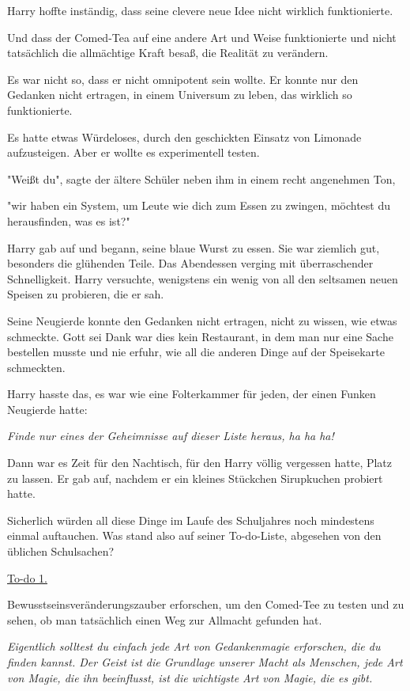 {Harry hoffte inständig, dass seine clevere neue Idee nicht wirklich funktionierte.

Und dass der Comed-Tea auf eine andere Art und Weise funktionierte und nicht tatsächlich die allmächtige Kraft besaß, die Realität zu verändern.

Es war nicht so, dass er nicht omnipotent sein wollte. Er konnte nur den Gedanken nicht ertragen, in einem Universum zu leben, das wirklich so funktionierte.

Es hatte etwas Würdeloses, durch den geschickten Einsatz von Limonade aufzusteigen. Aber er wollte es experimentell testen.

"Weißt du", sagte der ältere Schüler neben ihm in einem recht angenehmen Ton,

"wir haben ein System, um Leute wie dich zum Essen zu zwingen, möchtest du herausfinden, was es ist?"

Harry gab auf und begann, seine blaue Wurst zu essen. Sie war ziemlich gut, besonders die glühenden Teile. Das Abendessen verging mit überraschender Schnelligkeit. Harry versuchte, wenigstens ein wenig von all den seltsamen neuen Speisen zu probieren, die er sah.

Seine Neugierde konnte den Gedanken nicht ertragen, nicht zu wissen, wie etwas schmeckte. Gott sei Dank war dies kein Restaurant, in dem man nur eine Sache bestellen musste und nie erfuhr, wie all die anderen Dinge auf der Speisekarte schmeckten.

Harry hasste das, es war wie eine Folterkammer für jeden, der einen Funken Neugierde hatte:

\emph{Finde nur eines der Geheimnisse auf dieser Liste heraus, ha ha ha!}

Dann war es Zeit für den Nachtisch, für den Harry völlig vergessen hatte, Platz zu lassen. Er gab auf, nachdem er ein kleines Stückchen Sirupkuchen probiert hatte.

Sicherlich würden all diese Dinge im Laufe des Schuljahres noch mindestens einmal auftauchen. Was stand also auf seiner To-do-Liste, abgesehen von den üblichen Schulsachen?

\uline{To-do 1.}

Bewusstseinsveränderungszauber erforschen, um den Comed-Tee zu testen und zu sehen, ob man tatsächlich einen Weg zur Allmacht gefunden hat.

\emph{Eigentlich solltest du einfach jede Art von Gedankenmagie erforschen, die du finden kannst. Der Geist ist die Grundlage unserer Macht als Menschen, jede Art von Magie, die ihn beeinflusst, ist die wichtigste Art von Magie, die es gibt.}

}
